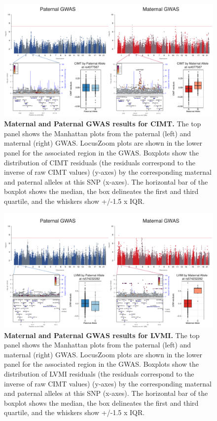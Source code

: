 \begin{figure}[!htb]
\centering
\includegraphics[width=5in]{img/ch02/fig-s2.pdf}
\caption[Maternal and Paternal GWAS results for CIMT.]{\textbf{Maternal and Paternal GWAS results for CIMT.}  The top panel shows the Manhattan plots from the paternal (left) and maternal (right) GWAS. LocusZoom plots are shown in the lower panel for the associated region in the GWAS. Boxplots show the distribution of CIMT residuals (the residuals correspond to the inverse of raw CIMT values) (y-axes) by the corresponding maternal and paternal alleles at this SNP (x-axes). The horizontal bar of the boxplot shows the median, the box delineates the first and third quartile, and the whiskers show +/-1.5 x IQR.}
\label{fig:fig-s2}
\end{figure}



\begin{figure}[!htb]
\centering
\includegraphics[width=5in]{img/ch02/fig-s3.pdf}
\caption[Maternal and Paternal GWAS results for LVMI.]{\textbf{Maternal and Paternal GWAS results for LVMI.}  The top panel shows the Manhattan plots from the paternal (left) and maternal (right) GWAS. LocusZoom plots are shown in the lower panel for the associated region in the GWAS. Boxplots show the distribution of LVMI residuals (the residuals correspond to the inverse of raw CIMT values) (y-axes) by the corresponding maternal and paternal alleles at this SNP (x-axes). The horizontal bar of the boxplot shows the median, the box delineates the first and third quartile, and the whiskers show +/-1.5 x IQR.}
\label{fig:fig-s3}
\end{figure}



